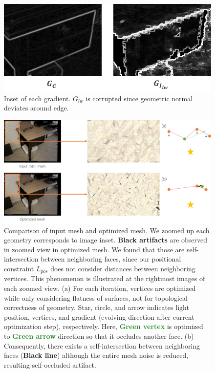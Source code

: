 \begin{figure}
    \includegraphics[width=\columnwidth]{figures/4_future_edge_fitting.png}
    \caption{Inset of each gradient. $G_{lw}$ is corrupted since geometric normal deviates around edge.}
    \label{fig:edge_fitting}
\end{figure}


\begin{figure}
    \includegraphics[width=\textwidth]{figures/4_future_work_self_intersection.png}
    \caption{Comparison of input mesh and optimized mesh. We zoomed up each geometry corresponds to image inset. 
    \textbf{Black artifacts} are observed in zoomed view in optimized mesh. We found that those are self-intersection between neighboring faces, since our positional constraint $L_{pos}$ does not consider distances between neighboring vertices. 
    This phenomenon is illustrated at the rightmost images of each zoomed view. 
    (a) For each iteration, vertices are optimized while only considering flatness of surfaces, not for topological correctness of geometry. 
    Star, circle, and arrow indicates light position, vertices, and gradient (evolving direction after current optimization step), respectively. 
    Here, \textbf{\textcolor{ForestGreen}{Green vertex}} is optimized to \textbf{\textcolor{ForestGreen}{Green arrow}} direction so that it occludes another face. 
    (b) Consequently, there exists a self-intersection between neighboring faces (\textbf{Black line}) although the entire mesh noise is reduced, resulting self-occluded artifact.}
    \label{fig:self_intersection}
\end{figure}

